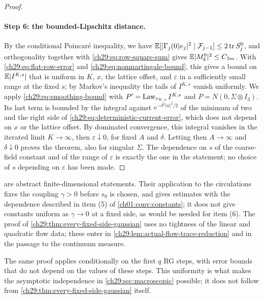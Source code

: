 \begin{proof}
\paragraph{Step 6: the bounded-Lipschitz distance.}
By the conditional Poincaré inequality, we have $\mathbb E[|\Gamma_j(0)e_j|^2\mid\mathcal F_{j-1}]\le2\operatorname{tr} S_j^0$, and orthogonality together with \eqref{ch29:eq:row-square-sum} gives $\mathbb E|M_k^0|^2\le C_{3m}$. With \eqref{ch29:eq:flat-row-error} and \eqref{ch29:eq:nonmartingale-bound}, this gives a bound on $\mathbb E|I^{K,s}|$ that is uniform in $K$, $x$, the lattice offset, and $\varepsilon$ in a sufficiently small range at the fixed $s$; by Markov's inequality the tails of $I^{K,s}$ vanish uniformly. We apply \eqref{ch29:eq:smoothing-bound} with $P'=\operatorname{Law}_{\nu_{K,s}}I^{K,s}$ and $P=N(0,\Sigma\otimes I_3)$. Its last term is bounded by the integral against $e^{-\delta^2|u|^2/2}$ of the minimum of two and the right side of \eqref{ch29:eq:deterministic-current-error}, which does not depend on $x$ or the lattice offset. By dominated convergence, this integral vanishes in the iterated limit $K\to\infty$, then $\varepsilon\downarrow0$, for fixed $A$ and $\delta$. Letting then $A\to\infty$ and $\delta\downarrow0$ proves the theorem, also for singular $\Sigma$. The dependence on $s$ of the coarse-field constant and of the range of $\varepsilon$ is exactly the one in the statement; no choice of $s$ depending on $\varepsilon$ has been made.
\end{proof}

\begin{remark}\label{ch29:rem:fixed-coupling-scope}
 are abstract finite-dimensional statements. Their application to the circulations fixes the coupling $\gamma>0$ before $s_0$ is chosen, and gives estimates with the dependence described in item (5) of \cref{ch01:conv:constants}; it does not give constants uniform as $\gamma\to0$ at a fixed side, as would be needed for item (6). The proof of \cref{ch29:thm:every-fixed-side-gaussian} uses no tightness of the linear and quadratic flow data; these enter in \cref{ch29:lem:actual-flow-trace-reduction} and in the passage to the continuum measure.
\end{remark}

The same proof applies conditionally on the first $q$ RG steps, with error bounds that do not depend on the values of these steps. This uniformity is what makes the asymptotic independence in \cref{ch29:sec:macroscopic} possible; it does not follow from \cref{ch29:thm:every-fixed-side-gaussian} itself.

